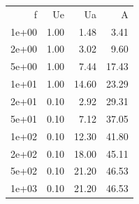 \begin{tabular}{rrrr}
f & Ue & Ua & A \\
1e+00 & 1.00 & 1.48 & 3.41 \\
2e+00 & 1.00 & 3.02 & 9.60 \\
5e+00 & 1.00 & 7.44 & 17.43 \\
1e+01 & 1.00 & 14.60 & 23.29 \\
2e+01 & 0.10 & 2.92 & 29.31 \\
5e+01 & 0.10 & 7.12 & 37.05 \\
1e+02 & 0.10 & 12.30 & 41.80 \\
2e+02 & 0.10 & 18.00 & 45.11 \\
5e+02 & 0.10 & 21.20 & 46.53 \\
1e+03 & 0.10 & 21.20 & 46.53 \\
\end{tabular}
